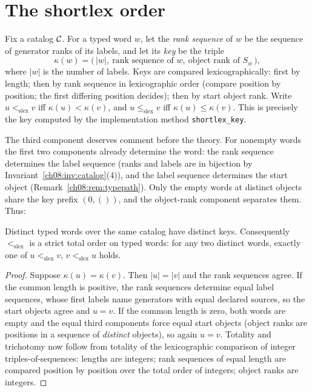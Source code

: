 \section{The shortlex order}\label{ch08:sec:shortlex}

\begin{definition}[Shortlex]\label{ch08:def:shortlex}
Fix a catalog $\mathcal{C}$. For a typed word $w$, let the \emph{rank sequence} of
$w$ be the sequence of generator ranks of its labels, and let its
\emph{key} be the triple
\[
\kappa(w)=\bigl(\,|w|,\ \text{rank sequence of } w,\
\text{object rank of } S_w\,\bigr),
\]
where $|w|$ is the number of labels. Keys are compared lexicographically:
first by length; then by rank sequence in lexicographic order (compare
position by position; the first differing position decides); then by start
object rank. Write $u<_{\mathrm{slex}}v$ iff $\kappa(u)<\kappa(v)$, and
$u\le_{\mathrm{slex}}v$ iff $\kappa(u)\le\kappa(v)$. This is precisely the
key computed by the implementation method \texttt{shortlex\_key}.
\end{definition}

The third component deserves comment before the theory. For nonempty words
the first two components already determine the word: the rank sequence
determines the label sequence (ranks and labels are in bijection by
Invariant~\ref{ch08:inv:catalog}(4)), and the label sequence determines the
start object (Remark~\ref{ch08:rem:typepath}). Only the empty words at
distinct objects share the key prefix $(0,())$, and the object-rank
component separates them. Thus:

\begin{lemma}\label{ch08:lem:keyinjective}
Distinct typed words over the same catalog have distinct keys. Consequently
$<_{\mathrm{slex}}$ is a strict total order on typed words: for any two
distinct words, exactly one of $u<_{\mathrm{slex}}v$, $v<_{\mathrm{slex}}u$
holds.
\end{lemma}

\begin{proof}
Suppose $\kappa(u)=\kappa(v)$. Then $|u|=|v|$ and the rank sequences agree.
If the common length is positive, the rank sequences determine equal label
sequences, whose first labels name generators with equal declared sources,
so the start objects agree and $u=v$. If the common length is zero, both
words are empty and the equal third components force equal start objects
(object ranks are positions in a sequence of \emph{distinct} objects), so
again $u=v$. Totality and trichotomy now follow from totality of the
lexicographic comparison of integer triples-of-sequences: lengths are
integers; rank sequences of equal length are compared position by position
over the total order of integers; object ranks are integers.
\end{proof}

